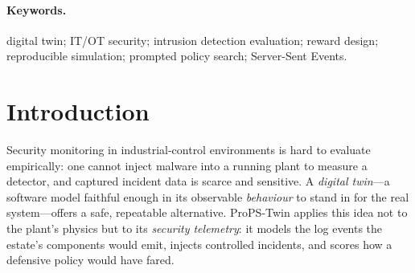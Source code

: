 \documentclass[11pt]{article}
\begin{document}
\begin{abstract}
\noindent
ProPS-Twin is a digital twin of the security-monitoring estate of an
industrial-control (IT/OT) environment, built to serve as a reproducible
testbed for \emph{policy evaluation}: given a defensive policy, how well would
the monitored estate detect, contain, remain available under, and recover from a
security incident? The implemented subsystem models five estate components across
four security zones, drives them through seven scripted incident scenarios
(SC-01--SC-07) under a deterministic virtual clock, and emits a stream of
JSON-lines telemetry identical in form to what containerised services would log.
A \emph{log-only} evaluator then re-derives detections from that telemetry
alone---never consulting ground truth until after detection---and condenses each
run into a single scalar reward composed of six normalised dimensions: detection,
containment, availability, recovery, and false-positive and delay penalties. The
system is implemented entirely on the Python standard library, is byte
reproducible for a fixed seed, and is validated by 48 automated tests. A
standard-library HTTP/Server-Sent-Events backend and a dependency-free browser
interface provide a live view of a run and allow two policy levers---access
profile and alert threshold---to be varied and their effect on the reward
observed in real time. We report the measured reward for all seven scenarios,
demonstrate that the policy levers produce the intended, test-pinned changes in
the reward, and state precisely which parts of the broader design (Kubernetes
orchestration, a Wazuh SIEM, and the LLM-driven policy optimiser) remain scaffolded
rather than implemented.
\end{abstract}

\paragraph{Keywords.} digital twin; IT/OT security; intrusion detection
evaluation; reward design; reproducible simulation; prompted policy search;
Server-Sent Events.

\tableofcontents
\clearpage

\section{Introduction}
Security monitoring in industrial-control environments is hard to evaluate
empirically: one cannot inject malware into a running plant to measure a
detector, and captured incident data is scarce and sensitive. A \emph{digital
twin}---a software model faithful enough in its observable \emph{behaviour} to
stand in for the real system---offers a safe, repeatable alternative. ProPS-Twin
applies this idea not to the plant's physics but to its \emph{security telemetry}:
it models the log events the estate's components would emit, injects controlled
incidents, and scores how a defensive policy would have fared.
\end{document}
